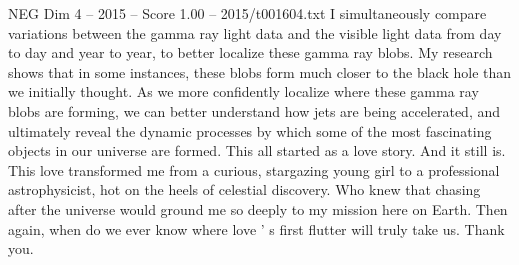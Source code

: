 \begin{textsample}{NEG Dim 4 – 2015 – Score 1.00 – 2015/t001604.txt}
I simultaneously compare variations between the gamma ray light data and the visible light data from day to day and year to year, to better localize these gamma ray blobs.
My research shows that in some instances, these blobs form much closer to the black hole than we initially thought.
As we more confidently localize where these gamma ray blobs are forming, we can better understand how jets are being accelerated, and ultimately reveal the dynamic processes by which some of the most fascinating objects in our universe are formed.
This all started as a love story.
And it still is.
This love transformed me from a curious, stargazing young girl to a professional astrophysicist, hot on the heels of celestial discovery.
Who knew that chasing after the universe would ground me so deeply to my mission here on Earth.
Then again, when do we ever know where love ' s first flutter will truly take us.
Thank you.

\end{textsample}
